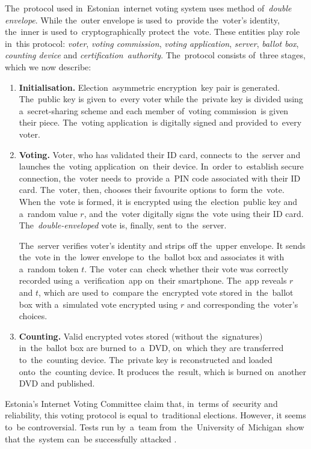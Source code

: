 The~protocol used in~Estonian~internet voting system uses method of~\emph{double envelope}. While the~outer envelope is used to~provide the~voter's identity, the~inner is used to~cryptographically protect the~vote. These entities play role in~this protocol: \emph{voter}, \emph{voting commission}, \emph{voting application}, \emph{server}, \emph{ballot box}, \emph{counting device} and \emph{certification~authority}. 
\bigbreak
The~protocol consists of~three stages, which we now describe: 
\begin{enumerate}
\item \textbf{Initialisation.} Election~asymmetric encryption~key pair is generated. The~public key is given to~every voter while the~private key is divided using a~secret-sharing scheme and each member of~voting commission~is given their piece. The~voting application~is digitally signed and provided to~every voter.
\item {\textbf{Voting.} Voter, who has validated their ID card, connects to~the~server and launches the~voting application~on~their device. In~order to~establish secure connection, the~voter needs to~provide a~PIN code associated with their ID card. The~voter, then, chooses their favourite options to~form the~vote. When the~vote is formed, it is encrypted using the~election~public key and a~random value $r$, and the~voter digitally signs the~vote using their ID card. The~\emph{double-enveloped} vote is, finally, sent to~the~server. 

The~server verifies voter's identity and strips off the~upper envelope. It sends the~vote in~the~lower envelope to~the~ballot box and associates it with a~random token $t$. The~voter can~check whether their vote was correctly recorded using a~verification~app on~their smartphone. The~app reveals $r$ and $t$, which are used to~compare the~encrypted vote stored in~the~ballot box with a~simulated vote encrypted using $r$ and corresponding the~voter's choices.}
\item \textbf{Counting.} Valid encrypted votes stored (without the~signatures) in~the~ballot box are burned to~a~DVD, on~which they are transferred to~the~counting device. The~private key is reconstructed and loaded onto~the~counting device. It produces the~result, which is burned on~another DVD and published.
\end{enumerate}
\bigbreak
Estonia's Internet Voting Committee claim that, in~terms of~security and reliability, this voting protocol is equal to~traditional elections. However, it seems to~be controversial. Tests run by~a~team from~the~University of~Michigan~show that the~system can~be successfully attacked \cite{Springall}.

